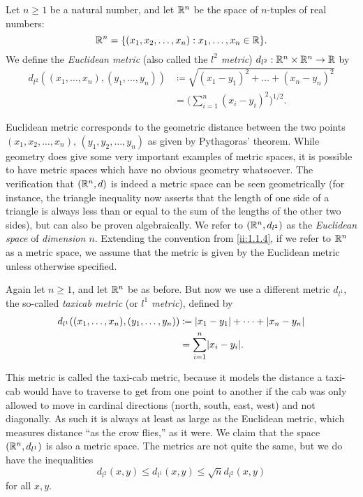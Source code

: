 \begin{eg}\label{ii:1.1.6}
  Let \(n \geq 1\) be a natural number, and let \(\mathbb{R}^n\) be the space of \(n\)-tuples of real numbers:
  \[
    \R^n = \set{(x_1, x_2, \dots, x_n) : x_1, \dots, x_n \in \R}.
  \]
  We define the \emph{Euclidean metric} (also called the \emph{\(l^2\) metric}) \(d_{l^2} : \mathbb{R}^n \times\mathbb{R}^n \to \mathbb{R}\) by
  \begin{align*}
    d_{l^2}((x_1, \dots, x_n), (y_1, \dots, y_n)) & \coloneqq \sqrt{(x_1 - y_1)^2 + \dots + (x_n - y_n)^2} \\
                                                  & = \bigg(\sum_{i = 1}^n (x_i - y_i)^2\bigg)^{1 / 2}.
  \end{align*}
\end{eg}

\begin{note}
  Euclidean metric corresponds to the geometric distance between the two points \((x_1, x_2, \dots, x_n)\), \((y_1, y_2, \dots, y_n)\) as given by Pythagoras' theorem.
  While geometry does give some very important examples of metric spaces, it is possible to have metric spaces which have no obvious geometry whatsoever.
  The verification that \((\mathbb{R}^n, d)\) is indeed a metric space can be seen geometrically (for instance, the triangle inequality now asserts that the length of one side of a triangle is always less than or equal to the sum of the lengths of the other two sides), but can also be proven algebraically.
  We refer to \((\mathbb{R}^n , d_{l^2})\) as the \emph{Euclidean space} of \emph{dimension \(n\)}.
  Extending the convention from \cref{ii:1.1.4}, if we refer to \(\mathbb{R}^n\) as a metric space, we assume that the metric is given by the Euclidean metric unless otherwise specified.
\end{note}

\begin{eg}\label{ii:1.1.7}
  Again let \(n \geq 1\), and let \(\mathbb{R}^n\) be as before.
  But now we use a different metric \(d_{l^1}\), the so-called \emph{taxicab metric} (or \emph{\(l^1\) metric}), defined by
  \begin{align*}
    d_{l^1}((x_1, \dots, x_n), (y_1, \dots, y_n)) & \coloneqq \abs{x_1 - y_1} + \dots + \abs{x_n - y_n} \\
                                                  & = \sum_{i = 1}^n \abs{x_i - y_i}.
  \end{align*}
\end{eg}

\begin{note}
  This metric is called the taxi-cab metric, because it models the distance a taxi-cab would have to traverse to get from one point to another if the cab was only allowed to move in cardinal directions (north, south, east, west) and not diagonally.
  As such it is always at least as large as the Euclidean metric, which measures distance ``as the crow flies,'' as it were.
  We claim that the space \((\mathbb{R}^n, d_{l^1})\) is also a metric space.
  The metrics are not quite the same, but we do have the inequalities
  \[
    d_{l^2}(x, y) \leq d_{l^1}(x, y) \leq \sqrt{n} d_{l^2}(x, y)
  \]
  for all \(x, y\).
\end{note}

